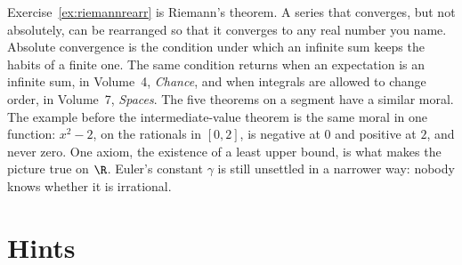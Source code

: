 \begin{beauty}
Exercise~\ref{ex:riemannrearr} is Riemann's theorem. A series that converges, but not absolutely, can be rearranged so that it converges to any real number you name. Absolute convergence is the condition under which an infinite sum keeps the habits of a finite one. The same condition returns when an expectation is an infinite sum, in Volume~4, \emph{Chance}, and when integrals are allowed to change order, in Volume~7, \emph{Spaces}. The five theorems on a segment have a similar moral. The example before the intermediate-value theorem is the same moral in one function: $x^2-2$, on the rationals in $[0,2]$, is negative at $0$ and positive at $2$, and never zero. One axiom, the existence of a least upper bound, is what makes the picture true on $\R$. Euler's constant $\gamma$ is still unsettled in a narrower way: nobody knows whether it is irrational.
\end{beauty}

\section{Hints}

